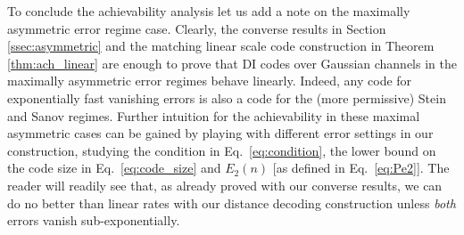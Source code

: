 \documentclass[10pt,conference]{IEEEtran}
\newcommand{\1}{\mathds{1}}
\DeclareMathOperator{\Tr}{Tr}
\newcommand{\EE}{\mathbb{E}}
\newcommand{\cN}{\mathcal{N}}
\begin{document}
To conclude the achievability analysis let us add a note on the maximally asymmetric error regime case. Clearly, the converse results in Section \ref{ssec:asymmetric} and the matching linear scale code construction in Theorem \ref{thm:ach_linear} are enough to prove that DI codes over Gaussian channels in the maximally asymmetric error regimes behave linearly. Indeed, any code for exponentially fast vanishing errors is also a code for the (more permissive) Stein and Sanov regimes. 
Further intuition for the achievability in these maximal asymmetric cases can be gained by playing with different error settings in our construction, studying the condition in Eq.~\eqref{eq:condition}, the lower bound on the code size in Eq.~\eqref{eq:code_size} and $E_2(n)$ [as defined in Eq.~\eqref{eq:Pe2}]. The reader will readily see that, as already proved with our converse results, we can do no better than linear rates with our distance decoding construction unless \emph{both} errors vanish sub-exponentially.

\end{document}
